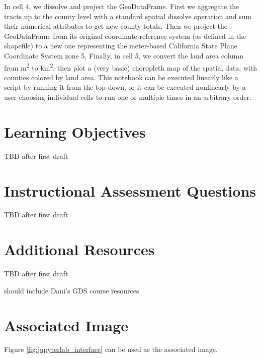 \documentclass[11pt,letterpaper]{article}
\begin{document}
In cell 4, we dissolve and project the GeoDataFrame. First we aggregate the tracts up to the county level with a standard spatial dissolve operation and sum their numerical attributes to get new county totals. Then we project the GeoDataFrame from its original coordinate reference system (as defined in the shapefile) to a new one representing the meter-based California State Plane Coordinate System zone 5. Finally, in cell 5, we convert the land area column from m\textsuperscript{2} to km\textsuperscript{2}, then plot a (very basic) choropleth map of the spatial data, with counties colored by land area. This notebook can be executed linearly like a script by running it from the top-down, or it can be executed nonlinearly by a user choosing individual cells to run one or multiple times in an arbitrary order.

\setlength{\bibsep}{0.00cm plus 0.05cm}



\section*{Learning Objectives}

TBD after first draft

\section*{Instructional Assessment Questions}

TBD after first draft

\section*{Additional Resources}

TBD after first draft

should include Dani's GDS course resources

\section*{Associated Image}

Figure \ref{fig:jupyterlab_interface} can be used as the associated image.
\end{document}
